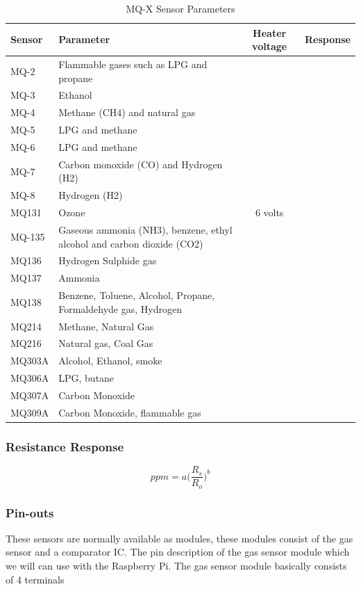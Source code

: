 \documentclass{article}\usepackage[]{graphicx}\usepackage[]{color}
\begin{document}
\begin{table}
\caption{MQ-X Sensor Parameters }
\begin{tabular}{lp{8cm}cc}\hline
Sensor  & Parameter       & Heater voltage   & Response \\ \hline\hline
MQ-2 & Flammable gases such as LPG and propane & & \\
MQ-3 & Ethanol && \\
MQ-4 & Methane (CH4) and natural gas && \\
MQ-5 & LPG and methane && \\
MQ-6 & LPG and methane && \\
MQ-7 & Carbon monoxide (CO) and Hydrogen (H2) && \\
MQ-8 & Hydrogen (H2) && \\
MQ131 & Ozone & 6 volts & \\
MQ-135 & Gaseous ammonia (NH3), benzene, ethyl alcohol and carbon dioxide (CO2) && \\
MQ136 & Hydrogen Sulphide gas  && \\
MQ137 & Ammonia  && \\
MQ138 & Benzene, Toluene, Alcohol, Propane, Formaldehyde gas, Hydrogen  && \\
MQ214 & Methane, Natural Gas  && \\
MQ216 & Natural gas, Coal Gas  && \\
MQ303A & Alcohol, Ethanol, smoke  && \\
MQ306A & LPG, butane  && \\
MQ307A &  Carbon Monoxide  && \\
MQ309A & Carbon Monoxide, flammable gas  && \\
\hline
\end{tabular}
\end{table}

\subsubsection{Resistance Response}

\begin{equation}
ppm = a\bigg( \frac{R_s}{R_o}\bigg)^b
\end{equation}

\subsubsection{Pin-outs}

These sensors are normally available as modules, these modules consist of the gas sensor and a comparator IC. The pin description of the gas sensor module which we will can use with the Raspberry Pi. The gas sensor module basically consists of 4 terminals
\end{document}
